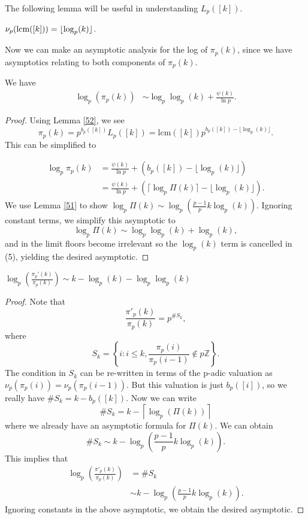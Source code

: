 \documentclass[12pt]{article}
\newcommand{\bra}[1]{{\left({#1}\right)}}
\begin{document}
\noindent The following lemma will be useful in understanding $L_p([k])$.

\begin{lemma}
$\nu_p(\textup{lcm}([k])) = \lfloor \log_p(k)\rfloor$.
\label{52}
\end{lemma}

\noindent Now we can make an asymptotic analysis for the log of $\pi_p(k)$, since we have asymptotics relating to both components of $\pi_p(k)$.

\begin{theorem} We have
\begin{align*}
\log_p(\pi_p(k)) &\sim \log_p\log_p(k) + \frac{\psi(k)}{\ln p}.
\end{align*}
\label{53}
\end{theorem}

\begin{proof}
Using Lemma \ref{52}, we see
\[\pi_p(k) = p^{b_p([k])}L_p([k]) = \text{lcm}([k])p^{b_p([k]) - \lfloor \log_p(k) \rfloor}.\]
This can be simplified to 

\begin{align*} 
\log_p\pi_p(k) &= \frac{\psi(k)}{\ln p}+\bra{b_p([k]) - \lfloor \log_p(k) \rfloor} \\
&=\frac{\psi(k)}{\ln p}+\bra{\lceil \log_p\Pi(k) \rceil - \lfloor \log_p(k) \rfloor}.  \tag{5}
\end{align*}
We use Lemma \ref{51} to show $\log_p\Pi(k) \sim \log_p\left(\frac{p-1}{p}k\log_p(k) \right)$. Ignoring constant terms, we simplify this asymptotic to
\[\log_p\Pi(k) \sim \log_p\log_p(k)+\log_p(k),\]
and in the limit floors become irrelevant so the $\log_p(k)$ term is cancelled in (5), yielding the desired asymptotic.
\end{proof}

\begin{lemma}
$\log_p\bra{\frac{\pi_p'(k)}{\pi_p(k)}} \sim k-\log_p(k)-\log_p\log_p(k)$
\label{54}
\end{lemma}

\begin{proof}
Note that
\[\frac{\pi'_p(k)}{\pi_p(k)} = p^{\#S_k},\]
where
\[S_k = \left\{i : i\le k, \frac{\pi_p(i)}{\pi_p(i-1)}\not \in p\mathbb{Z}\right\}.\]
The condition in $S_k$ can be re-written in terms of the p-adic valuation as $\nu_p(\pi_p(i)) = \nu_p(\pi_p(i-1))$. But this valuation is just $b_p([i])$, so we really have $\#S_k = k-b_p([k])$. Now we can write
\[\#S_k = k - \left\lceil \log_p \left( \Pi(k) \right)\right\rceil\]
where we already have an asymptotic formula for $\Pi(k)$. We can obtain
\[\#S_k \sim k - \log_p\left(\frac{p-1}{p}k\log_p(k)\right).\]
This implies that
\begin{align*}
\log_p \left( \frac{\pi'_p(k)}{\pi_p(k)} \right) &= \#S_k \\ 
&\sim k - \log_p\left(\frac{p-1}{p}k\log_p(k)\right).
\end{align*}
Ignoring constants in the above asymptotic, we obtain the desired asymptotic.
\end{proof}
\end{document}
